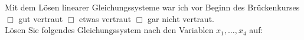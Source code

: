 \documentclass[12pt,answers]{exam}
\begin{document}
\begin{questions}
\begin{solution}
\end{solution}

\pagebreak
{}

Mit dem Lösen linearer Gleichungssysteme war ich vor Beginn des Brückenkurses\\ $\Box$ gut vertraut \hfill $\Box$ etwas vertraut \hfill $\Box$ gar nicht vertraut. \\[2ex]
L\"osen Sie folgendes Gleichungssystem nach den Variablen $x_1,\ldots,x_4$
auf:


\end{questions}
\end{document}
